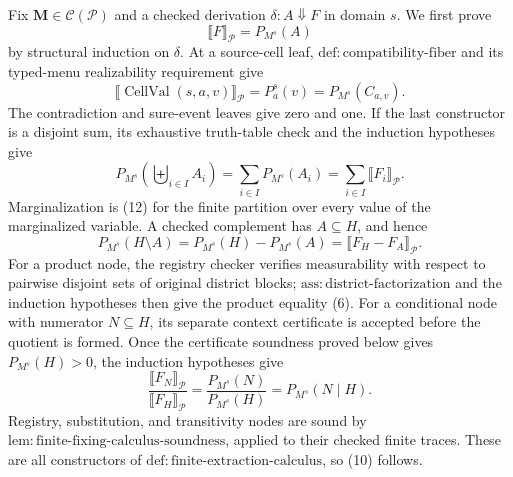 Fix \(\mathbf M\in\mathcal C(\mathcal P)\) and a checked derivation \(\delta:A\Downarrow F\) in domain \(s\).  We first prove
\[
\llbracket F\rrbracket_{\mathcal P}=P_{M^s}(A)
\tag{10}
\]
by structural induction on \(\delta\).  At a source-cell leaf, \(\mathrm{def:compatibility\text{-}fiber}\) and its typed-menu realizability requirement give
\[
\llbracket\operatorname{CellVal}(s,a,v)\rrbracket_{\mathcal P}
=P_a^s(v)
=P_{M^s}(C_{a,v}).
\tag{11}
\]
The contradiction and sure-event leaves give zero and one.  If the last constructor is a disjoint sum, its exhaustive truth-table check and the induction hypotheses give
\[
P_{M^s}\!\left(\biguplus_{i\in I}A_i\right)
=\sum_{i\in I}P_{M^s}(A_i)
=\sum_{i\in I}\llbracket F_i\rrbracket_{\mathcal P}.
\tag{12}
\]
Marginalization is (12) for the finite partition over every value of the marginalized variable.  A checked complement has \(A\subseteq H\), and hence
\[
P_{M^s}(H\setminus A)
=P_{M^s}(H)-P_{M^s}(A)
=\llbracket F_H-F_A\rrbracket_{\mathcal P}.
\tag{13}
\]
For a product node, the registry checker verifies measurability with respect to pairwise disjoint sets of original district blocks; \(\mathrm{ass:district\text{-}factorization}\) and the induction hypotheses then give the product equality (6).  For a conditional node with numerator \(N\subseteq H\), its separate context certificate is accepted before the quotient is formed.  Once the certificate soundness proved below gives \(P_{M^s}(H)>0\), the induction hypotheses give
\[
\frac{\llbracket F_N\rrbracket_{\mathcal P}}
     {\llbracket F_H\rrbracket_{\mathcal P}}
=\frac{P_{M^s}(N)}{P_{M^s}(H)}
=P_{M^s}(N\mid H).
\tag{14}
\]
Registry, substitution, and transitivity nodes are sound by \(\mathrm{lem:finite\text{-}fixing\text{-}calculus\text{-}soundness}\), applied to their checked finite traces.  These are all constructors of \(\mathrm{def:finite\text{-}extraction\text{-}calculus}\), so (10) follows.

